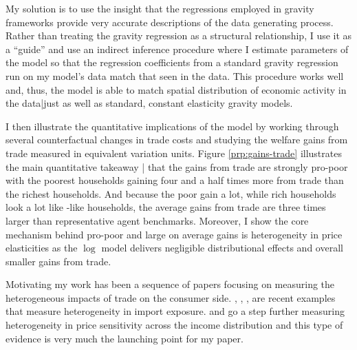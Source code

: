 \documentclass[12pt,pdftex]{article}
\begin{document}
\begin{onehalfspacing}
My solution is to use the insight that the regressions employed in gravity frameworks provide very accurate descriptions of the data generating process. Rather than treating the gravity regression as a structural relationship, I use it as a ``guide'' and use an indirect inference procedure where I estimate parameters of the model so that the regression coefficients from a standard gravity regression run on my model's data match that seen in the data. This procedure works well and, thus, the model is able to match spatial distribution of economic activity in the data|just as well as standard, constant elasticity gravity models.

I then illustrate the quantitative implications of the model by working through several counterfactual changes in trade costs and studying the welfare gains from trade measured in equivalent variation units. Figure \ref{prp:gains-trade} illustrates the main quantitative takeaway | that the gains from trade are strongly pro-poor with the poorest households gaining four and a half times more from trade than the richest households. And because the poor gain a lot, while rich households look a lot like \citet{arkolakis2012new}-like households, the average gains from trade are three times larger than representative agent benchmarks. Moreover, I show the core mechanism behind pro-poor and large on average gains is heterogeneity in price elasticities as the $\log$ model delivers negligible distributional effects and overall smaller gains from trade.



Motivating my work has been a sequence of papers focusing on measuring the heterogeneous impacts of trade on the consumer side. \citet{fajgelbaum2016measuring}, \citet{carroll2020heterogeneous}, \citet{borusyak2021distributional}, \citet{jaccardtoronto} are recent examples that measure heterogeneity in import exposure. \citet*{auer2022unequal} and \citet*{colicev2022impact} go a step further measuring heterogeneity in price sensitivity across the income distribution and this type of evidence is very much the launching point for my paper.


\end{onehalfspacing}
\end{document}
